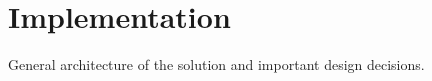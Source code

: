 \chapter{Implementation}
\label{c:implementation}

General architecture of the solution and important design decisions.
